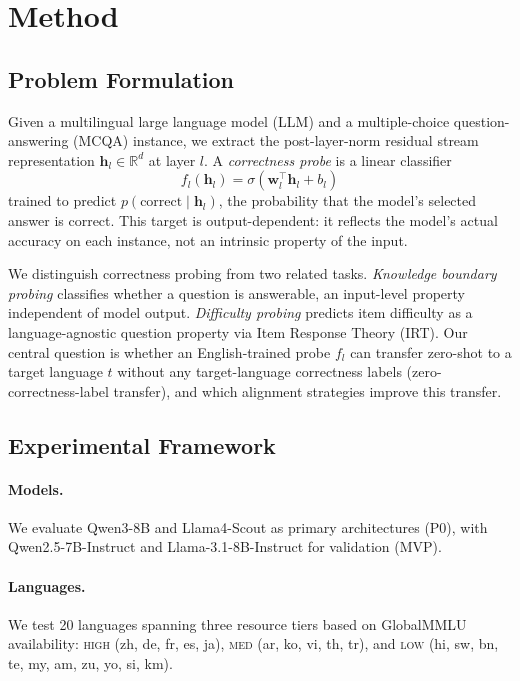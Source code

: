 \section{Method}
\label{sec:method}

\subsection{Problem Formulation}
\label{sec:problem}

Given a multilingual large language model (LLM) and a multiple-choice question-answering (MCQA) instance, we extract the post-layer-norm residual stream representation $\mathbf{h}_l \in \mathbb{R}^d$ at layer $l$. A \emph{correctness probe} is a linear classifier
\begin{equation}
  f_l(\mathbf{h}_l) = \sigma(\mathbf{w}_l^\top \mathbf{h}_l + b_l)
  \label{eq:probe}
\end{equation}
trained to predict $p(\text{correct} \mid \mathbf{h}_l)$, the probability that the model's selected answer is correct. This target is output-dependent: it reflects the model's actual accuracy on each instance, not an intrinsic property of the input.

We distinguish correctness probing from two related tasks. \emph{Knowledge boundary probing} \citep{xiao2025knowledge} classifies whether a question is answerable, an input-level property independent of model output. \emph{Difficulty probing} \citep{civelli2026shared} predicts item difficulty as a language-agnostic question property via Item Response Theory (IRT). Our central question is whether an English-trained probe $f_l$ can transfer zero-shot to a target language $t$ without any target-language correctness labels (zero-correctness-label transfer), and which alignment strategies improve this transfer.

\subsection{Experimental Framework}
\label{sec:framework}

\paragraph{Models.} We evaluate Qwen3-8B and Llama4-Scout as primary architectures (P0), with Qwen2.5-7B-Instruct and Llama-3.1-8B-Instruct for validation (MVP).

\paragraph{Languages.} We test 20 languages spanning three resource tiers based on GlobalMMLU availability: \textsc{high} (zh, de, fr, es, ja), \textsc{med} (ar, ko, vi, th, tr), and \textsc{low} (hi, sw, bn, te, my, am, zu, yo, si, km).

